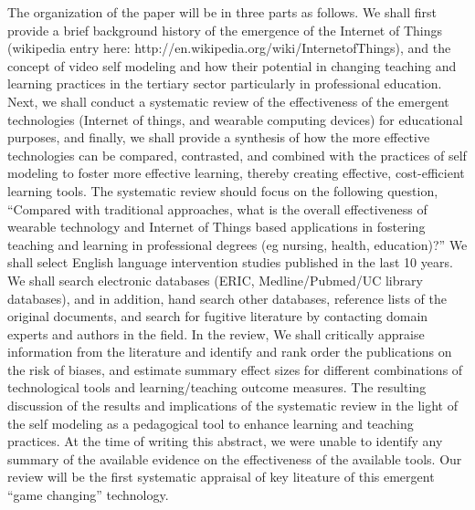 The organization of the paper will be in three parts as follows. We shall first provide a brief background history of the emergence of the Internet of Things (wikipedia entry here: http://en.wikipedia.org/wiki/InternetofThings), and the concept of video self modeling and how their potential in changing teaching and learning practices in the tertiary sector particularly in professional education. Next, we shall conduct a systematic review of the effectiveness of the emergent technologies (Internet of things, and wearable computing devices) for educational purposes, and finally, we shall provide a synthesis of how the more effective technologies can be compared, contrasted, and combined with the practices of self modeling to foster more effective learning, thereby creating effective, cost-efficient learning tools.
The systematic review should focus on the following question, “Compared with traditional approaches, what is the overall effectiveness of wearable technology and Internet of Things based applications in fostering teaching and learning in professional degrees (eg nursing, health, education)?” We shall select English language intervention studies published in the last 10 years. We shall search electronic databases (ERIC, Medline/Pubmed/UC library databases), and in addition, hand search other databases, reference lists of the original documents, and search for fugitive literature by contacting domain experts and authors in the field. In the review, We shall critically appraise information from the literature and identify and rank order the publications on the risk of biases, and estimate summary effect sizes for different combinations of technological tools and learning/teaching outcome measures.
The resulting discussion of the results and implications of the systematic review in the light of the self modeling as a pedagogical tool to enhance learning and teaching practices.
At the time of writing this abstract, we were unable to identify any summary of the available evidence on the effectiveness of the available tools. Our review will be the first systematic appraisal of key liteature of this emergent “game changing” technology.
